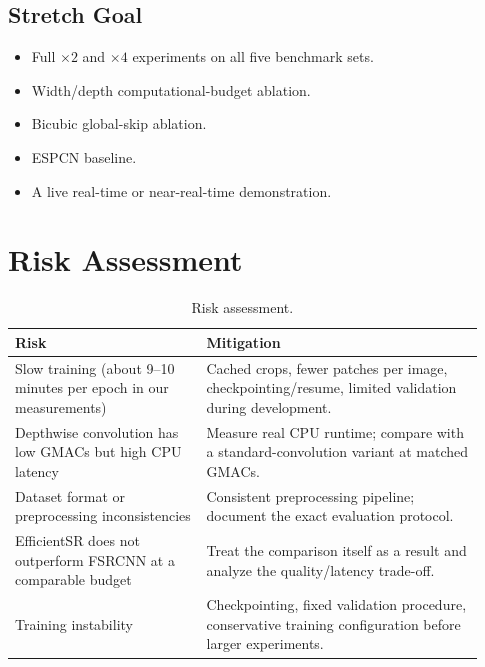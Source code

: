 \documentclass[11pt,a4paper]{article}
\begin{document}
\subsection{Stretch Goal}

\begin{itemize}
    \item Full $\times2$ and $\times4$ experiments on all five benchmark sets.
    \item Width/depth computational-budget ablation.
    \item Bicubic global-skip ablation.
    \item ESPCN baseline.
    \item A live real-time or near-real-time demonstration.
\end{itemize}

\section{Risk Assessment}
\label{sec:risk}

\begin{table}[h]
\centering
\caption{Risk assessment.}
\label{tab:risks}
\small
\begin{tabular}{@{}p{0.38\linewidth}p{0.55\linewidth}@{}}
\toprule
\textbf{Risk} & \textbf{Mitigation} \\
\midrule
Slow training (about 9--10 minutes per epoch in our measurements) &
Cached crops, fewer patches per image, checkpointing/resume, limited
validation during development. \\

Depthwise convolution has low GMACs but high CPU latency &
Measure real CPU runtime; compare with a standard-convolution variant at
matched GMACs. \\

Dataset format or preprocessing inconsistencies &
Consistent preprocessing pipeline; document the exact evaluation
protocol. \\

EfficientSR does not outperform FSRCNN at a comparable budget &
Treat the comparison itself as a result and analyze the quality/latency
trade-off. \\

Training instability &
Checkpointing, fixed validation procedure, conservative training
configuration before larger experiments. \\
\bottomrule
\end{tabular}
\end{table}
\end{document}
